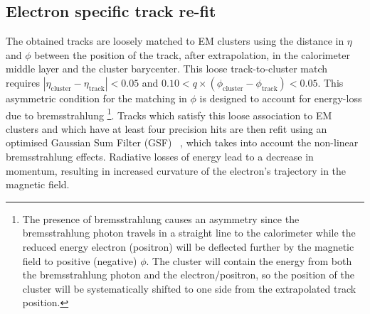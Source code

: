 \subsection{Electron specific track re-fit}\label{sec:egamma:trackrefit}
The obtained tracks are loosely matched to EM clusters using the
distance in $\eta$ and $\phi$ between the position of the track,
after extrapolation, in the calorimeter middle layer and the cluster barycenter.
This loose track-to-cluster match requires $| \eta_{\mathrm{cluster}} - \eta_{\mathrm{track}} | <0.05$ and $0.10 < q \times (\phi_{\mathrm{cluster}} - \phi_{\mathrm{track}}) <0.05$.
This asymmetric condition for the matching in $\phi$ is designed to account for energy-loss due to bremsstrahlung
\footnote{The presence of bremsstrahlung causes an asymmetry since the bremsstrahlung photon travels in a straight line to the calorimeter while the reduced energy electron (positron) will be deflected further by the magnetic field to positive (negative) $\phi$.
The cluster will contain the energy from both the bremsstrahlung photon and the electron/positron, so the position of the cluster will be systematically shifted to one side from the extrapolated track position.}.
Tracks which satisfy this loose association to EM clusters and which have at least four precision hits are then refit using an optimised Gaussian Sum Filter (GSF) ~\cite{ATLAS-CONF-2012-047}, which takes into account the non-linear bremsstrahlung effects. 
Radiative losses of energy lead to a decrease in momentum, resulting in increased curvature of the electron’s trajectory in the magnetic field.
